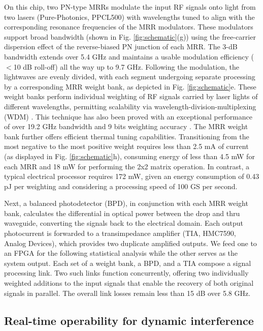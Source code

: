 \documentclass[pdflatex,mathphys]{sty}%
\begin{document}
On this chip, two PN-type MRRs modulate the input RF signals onto light from two lasers (Pure-Photonics, PPCL500) with wavelengths tuned to align with the corresponding resonance frequencies of the MRR modulators. These modulators support broad bandwidth (shown in Fig. \ref{fig:schematic}(g)) using the free-carrier dispersion effect of the reverse-biased PN junction of each MRR. The 3-dB bandwidth extends over 5.4 GHz and maintains a usable modulation efficiency ($<$10 dB roll-off) all the way up to 9.7 GHz. Following the modulation, the lightwaves are evenly divided, with each segment undergoing separate processing by a corresponding MRR weight bank, as depicted in Fig. \ref{fig:schematic}e. These weight banks perform individual weighting of RF signals carried by laser lights of different wavelengths, permitting scalability via wavelength-division-multiplexing (WDM) \cite{tait2014broadcast}. This technique has also been proved with an exceptional performance of over 19.2 GHz bandwidth \cite{zhang2022broadband} and 9 bits weighting accuracy \cite{zhang2022silicon}. The MRR weight bank further offers efficient thermal tuning capabilities. Transitioning from the most negative to the most positive weight requires less than 2.5 mA of current (as displayed in Fig. \ref{fig:schematic}h), consuming energy of less than 4.5 mW for each MRR and 18 mW for performing the 2x2 matrix operation. In contrast, a typical electrical processor requires 172 mW, given an energy consumption of 0.43 pJ per weighting \cite{jouppi2017datacenter} and considering a processing speed of 100 GS per second.

Next, a balanced photodetector (BPD), in conjunction with each MRR weight bank, calculates the differential in optical power between the drop and thru waveguide, converting the signals back to the electrical domain. Each output photocurrent is forwarded to a transimpedance amplifier (TIA, HMC7590, Analog Devices), which provides two duplicate amplified outputs. We feed one to an FPGA for the following statistical analysis while the other serves as the system output. Each set of a weight bank, a BPD, and a TIA compose a signal processing link. Two such links function concurrently, offering two individually weighted additions to the input signals that enable the recovery of both original signals in parallel. The overall link losses remain less than 15 dB over 5.8 GHz.

\subsection{Real-time operability for dynamic interference}
\end{document}
